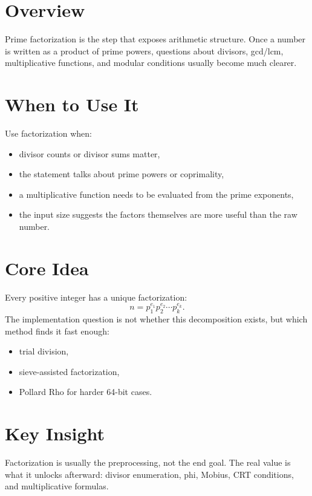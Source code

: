\section*{Overview}

Prime factorization is the step that exposes arithmetic structure. Once a number is written as a product of prime powers,
questions about divisors, gcd/lcm, multiplicative functions, and modular conditions usually become much clearer.

\section*{When to Use It}

Use factorization when:

\begin{itemize}
  \item divisor counts or divisor sums matter,
  \item the statement talks about prime powers or coprimality,
  \item a multiplicative function needs to be evaluated from the prime exponents,
  \item the input size suggests the factors themselves are more useful than the raw number.
\end{itemize}

\section*{Core Idea}

Every positive integer has a unique factorization:
\[
n = p_1^{e_1} p_2^{e_2} \cdots p_k^{e_k}.
\]
The implementation question is not whether this decomposition exists, but which method finds it fast enough:

\begin{itemize}
  \item trial division,
  \item sieve-assisted factorization,
  \item Pollard Rho for harder 64-bit cases.
\end{itemize}

\section*{Key Insight}

Factorization is usually the preprocessing, not the end goal. The real value is what it unlocks afterward: divisor
enumeration, phi, Mobius, CRT conditions, and multiplicative formulas.

